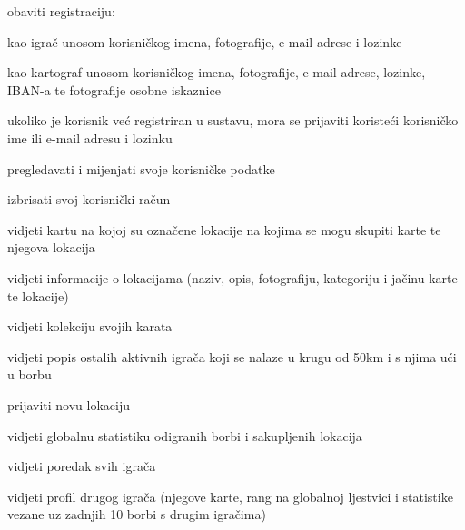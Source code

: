 			
			\begin{packed_enum}
				\item  {}
				
				\begin{packed_enum}
					
					\item obaviti registraciju:
						\begin{packed_enum}
							\item kao igrač  unosom korisničkog imena, fotografije, e-mail adrese i lozinke
							\item kao kartograf unosom korisničkog imena, fotografije, e-mail adrese, lozinke, IBAN-a te fotografije osobne iskaznice
						\end{packed_enum}
					\item ukoliko je korisnik već registriran u sustavu, mora se prijaviti koristeći korisničko ime ili e-mail adresu i lozinku
				\end{packed_enum}
			
				\item  \underbar{Igrač (inicijator) može:}
					
					\begin{packed_enum}
					
						\item pregledavati i mijenjati svoje korisničke podatke
						\item izbrisati svoj korisnički račun
						\item vidjeti kartu na kojoj su označene lokacije na kojima se mogu skupiti karte te njegova lokacija
						\item vidjeti informacije o lokacijama (naziv, opis, fotografiju, kategoriju i jačinu karte te lokacije)
						\item vidjeti kolekciju svojih karata
						\item vidjeti popis ostalih aktivnih igrača koji se nalaze u krugu od 50km i s njima ući u borbu
						\item prijaviti novu lokaciju
						\item vidjeti globalnu statistiku odigranih borbi i sakupljenih lokacija
						\item vidjeti poredak svih igrača
						\item vidjeti profil drugog igrača (njegove karte, rang na globalnoj ljestvici i statistike vezane uz zadnjih 10 borbi s drugim igračima)
					
					\end{packed_enum}
				

\end{packed_enum}
